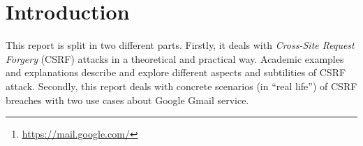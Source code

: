 \documentclass[a4paper,11pt,openany]{report}
\newcommand{\csrf}{\textit{Cross-Site Request Forgery}}
\begin{document}
\begin{abstract}
  In our second part we focused our attention on concrete applications of CSRF vulnerabilities. 
  Lots of companies were affected in the past and we decided to deal with Google's well-known 
  stories about CSRF. Two different vulnerabilities were discovered in 2007 concerning 
  Google's \footnote{\url{https://mail.google.com/}} email service Gmail.
  
  Finally, we implemented a small webapp with different services, either vulnerable or protected, 
  from CSRF attack. This webapp featured an attacker website (both developed from scratch), 
  the outline of different practical examples of the attack and different ways to prevent it.
  \end{abstract}
  

\tableofcontents{} %
\clearpage %
\setcounter{page}{1} %

  

  \section{Introduction}
  This report is split in two different parts. Firstly, it deals with \csrf{} (CSRF) attacks in 
  a theoretical and practical way. Academic examples and explanations describe and explore 
  different aspects and subtilities of CSRF attack. Secondly, this report deals with concrete 
  scenarios (in ``real life'') of CSRF breaches with two use cases about Google Gmail service.
\end{document}
